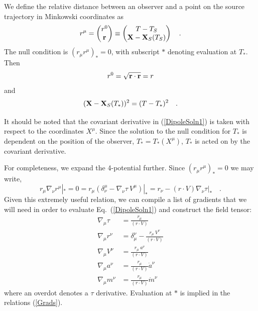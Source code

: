 We define the relative distance between an observer and a point on the
source trajectory in Minkowski coordinates as
\begin{equation}
r^\mu =
\begin{pmatrix}r^0 \\
{\bf{r}}
\end{pmatrix}
\equiv 
\begin{pmatrix}
T-T_{S} \\
{\bf{X}}-{\bf{X}}_{S}(T_S)
\end{pmatrix} \quad .
\end{equation}
The null condition is
$(r_\mu r^\mu )_* =0$,
with subscript $*$ denoting evaluation at $T_*$. Then 
\begin{equation}
r^0=\sqrt{{\bf r} \cdot {\bf r}}=r
\end{equation} 
and
\begin{equation}
({\bf{X}}-{\bf{X}}_S (T_*))^2= (T-T_*)^2 \quad .
\label{Eq:Tcond}
\end{equation}


It should be noted that the covariant derivative in
(\ref{DipoleSoln1}) is taken with respect to the coordinates
$X^\mu$. Since the solution to the null condition for $T_*$ is
dependent on the position of the observer, $T_* = T_*(X^{\mu})$,
$T_*$ is acted on by the covariant derivative.

For completeness, we
expand the 4-potential further.
Since $(r_\mu r^\mu)_* =0$ we may write,
\begin{equation}
r_\mu \nabla_\nu r^\mu |_* =0=
r_\mu \left (\delta^\mu_\nu-\nabla_\nu \tau \ V^\mu \right
)|_*=r_\nu- (r\cdot V)\nabla_\nu\tau |_* \quad .
\nonumber 
\end{equation}
Given this extremely useful relation, we can compile a list
of gradients that we will need in order to evaluate Eq.\ (\ref{DipoleSoln1}) and construct the field tensor:
\begin{align}
\nabla_\mu \tau & = \frac{r_\mu}{(r\cdot V)} \nonumber \\
\nabla_\mu r^\nu &= \delta_{\mu}^{ \nu}-\frac{r_\mu \ V^\nu}{(r\cdot V)}
\nonumber \\
\nabla_\mu V^\nu &= \frac{r_\mu \ a^\nu}{(r\cdot V)} \nonumber \\
\nabla_\mu a^\nu &=  \frac{r_\mu}{(r\cdot V)}\dot{a}^{\nu}  \nonumber \\
\nabla_\mu m^\nu &=  \frac{r_\mu}{(r\cdot V)}\dot{m}^{\nu} 
\label{Grads}
\end{align}
where an overdot denotes a $\tau$ derivative. Evaluation at $*$ is
implied in the relations (\ref{Grads}).


